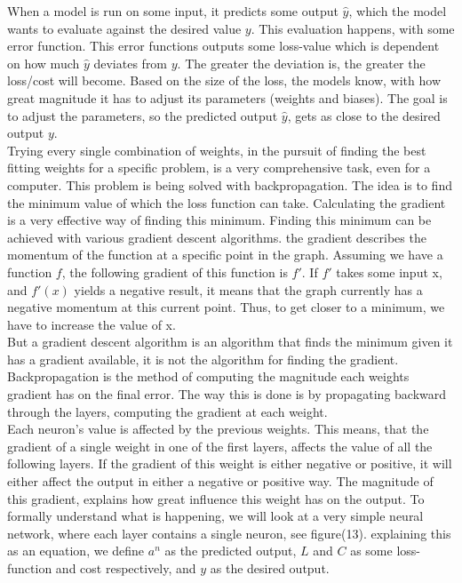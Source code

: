 When a model is run on some input, it predicts some output $\hat{y}$, which the model wants to evaluate against the desired value $y$. This evaluation happens, with some error function. This error functions outputs some loss-value which is dependent on how much $\hat{y}$ deviates from $y$. The greater the deviation is, the greater the loss/cost will become.
Based on the size of the loss, the models know, with how great magnitude it has to adjust its parameters (weights and biases). The goal is to adjust the parameters, so the predicted output $\hat{y}$, gets as close to the desired output $y$.\\

\noindent
Trying every single combination of weights, in the pursuit of finding the best fitting weights for a specific problem, is a very comprehensive task, even for a computer. This problem is being solved with backpropagation. The idea is to find the minimum value of which the loss function can take. Calculating the gradient is a very effective way of finding this minimum. Finding this minimum can be achieved with various gradient descent algorithms. the gradient describes the momentum of the function at a specific point in the graph. Assuming we have a function $f$, the following gradient of this function is $f'$. If $f'$ takes some input x, and $f'(x)$ yields a negative result, it means that the graph currently has a negative momentum at this current point. Thus, to get closer to a minimum, we have to increase the value of x. \\

\noindent
But a gradient descent algorithm is an algorithm that finds the minimum given it has a gradient available, it is not the algorithm for finding the gradient. Backpropagation is the method of computing the magnitude each weights gradient has on the final error. The way this is done is by propagating backward through the layers, computing the gradient at each weight. \\

\noindent
Each neuron's value is affected by the previous weights. This means, that the gradient of a single weight in one of the first layers, affects the value of all the following layers. If the gradient of this weight is either negative or positive, it will either affect the output in either a negative or positive way. The magnitude of this gradient, explains how great influence this weight has on the output.
To formally understand what is happening, we will look at a very simple neural network, where each layer contains a single neuron, see figure(13). explaining this as an equation, we define $a^n$ as the predicted output, $L$ and $C$ as some loss-function and cost respectively, and $y$ as the desired output.

